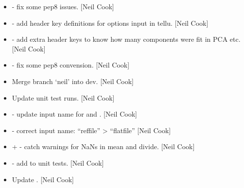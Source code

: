 \documentclass[a4paper,10pt,english]{report}
\begin{document}
\begin{itemize}
\item {} 
 - fix some pep8 issues. {[}Neil Cook{]}

\item {} 
 - add header key definitions for options input in
tellu. {[}Neil Cook{]}

\item {} 
 - add extra header keys to know how many components
were fit in PCA etc. {[}Neil Cook{]}

\item {} 
 - fix some pep8 convension. {[}Neil Cook{]}

\item {} 
Merge branch ‘neil’ into dev. {[}Neil Cook{]}

\item {} 
Update unit test runs. {[}Neil Cook{]}

\item {} 
 - update input name for  and
. {[}Neil Cook{]}

\item {} 
 - correct input name: “reffile” \textendash{}\textgreater{} “flatfile”
{[}Neil Cook{]}

\item {} 
 +  - catch warnings for NaNs in mean
and divide. {[}Neil Cook{]}

\item {} 
 - add  to unit tests. {[}Neil
Cook{]}

\item {} 
Update . {[}Neil Cook{]}

\end{itemize}
\end{document}
